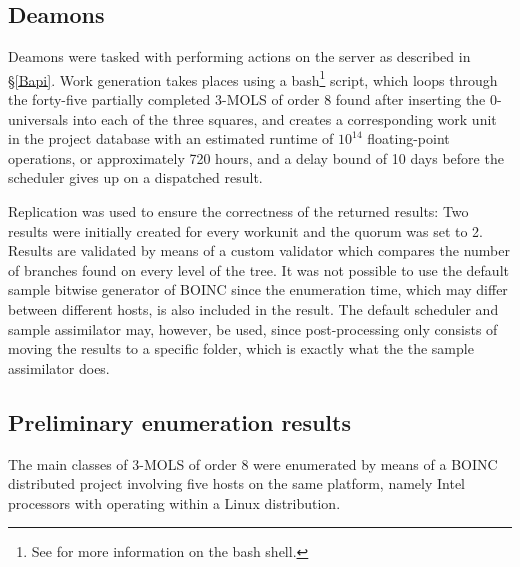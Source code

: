 \subsection{Deamons} \label{5deamons}
Deamons were tasked with performing actions on the server as described in \S\ref{Bapi}. Work generation takes places using a bash\footnote{See \cite{bash} for more information on the bash shell.} script, which loops through the forty-five partially completed 3-MOLS of order 8 found after inserting the 0-universals into each of the three squares, and creates a corresponding work unit in the project database with an estimated runtime of $10^{14}$ floating-point operations, or approximately 720 hours, and a delay bound of 10 days before the scheduler gives up on a dispatched result.

Replication was used to ensure the correctness of the returned results: Two results were initially created for every workunit and the quorum was set to 2. Results are validated by means of a custom validator which compares the number of branches found on every level of the tree. It was not possible to use the default sample bitwise generator of BOINC since the enumeration time, which may differ between different hosts, is also included in the result.
The default scheduler and sample assimilator may, however, be used, since post-processing only consists of moving the results to a specific folder, which is exactly what the the sample assimilator does. 

\subsection{Preliminary enumeration results} \label{5pres}
The main classes of 3-MOLS of order 8 were enumerated by means of a BOINC distributed project involving five hosts on the same platform, namely Intel processors with  operating within a  Linux distribution.

